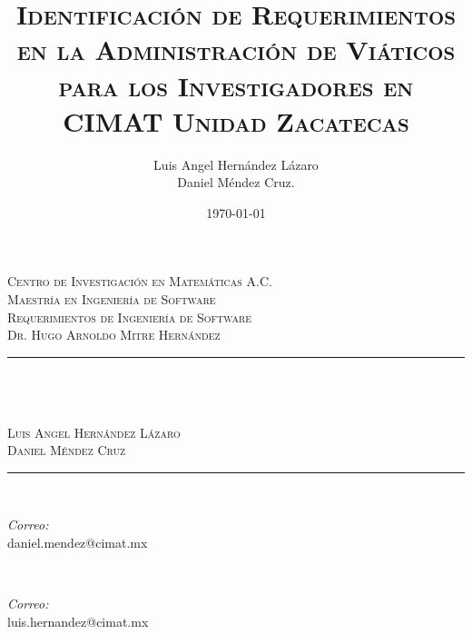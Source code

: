 \documentclass{report}
\title{\textsc{Identificación de Requerimientos en la Administración de Viáticos para los Investigadores en CIMAT Unidad Zacatecas}}
\author{Luis Angel Hernández Lázaro\\  Daniel Méndez Cruz. }
\date{\today}
\makeatletter
\let\thetitle\@title
\makeatother
\begin{document}

\begin{titlepage}
	\centering
    \vspace*{0.5 cm}
    
    
    \begin{figure}
		\centering
	\end{figure}
    \textsc{\LARGE Centro de Investigación en Matemáticas A.C.}\\[1.0 cm]
	\textsc{\Large Maestría en Ingeniería de Software}\\[0.5 cm]
	\textsc{\large Requerimientos de Ingeniería de Software\\Dr. Hugo Arnoldo Mitre Hernández}\\[0.5 cm]
	\rule{\linewidth}{0.2 mm} \\[0.4 cm]
	{ \huge \bfseries \thetitle}\\ \textsc{\large \\ Luis Angel Hernández Lázaro \\ Daniel Méndez Cruz}
	\rule{\linewidth}{0.2 mm} \\[1.5 cm]
	
	\begin{minipage}{0.5\textwidth}
		\begin{flushleft} \large
			\emph{Correo:}\\
			daniel.mendez@cimat.mx
		\end{flushleft}
	\end{minipage}~
	\begin{minipage}{0.4\textwidth}
		\begin{flushright} \large
			\emph{Correo:} \\
			luis.hernandez@cimat.mx
		\end{flushright}
	\end{minipage}\\[2 cm]
		

\end{titlepage}
\end{document}
